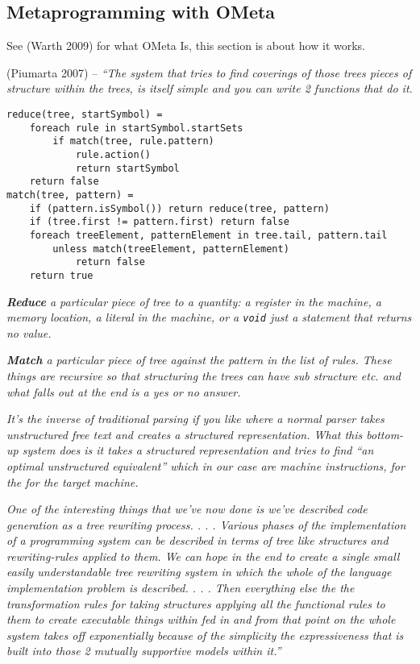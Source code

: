 \hypertarget{metaprogramming-with-ometa}{%
\subsection{\texorpdfstring{Metaprogramming with
\textbf{OMeta}}{Metaprogramming with OMeta}}\label{metaprogramming-with-ometa}}

See (Warth 2009) for what OMeta Is, this section is about how it works.

(Piumarta 2007) -- \emph{``The system that tries to find coverings of
those trees pieces of structure within the trees, is itself simple and
you can write 2 functions that do it.}

\begin{verbatim}
reduce(tree, startSymbol) =
    foreach rule in startSymbol.startSets
        if match(tree, rule.pattern)
            rule.action()
            return startSymbol
    return false
match(tree, pattern) =
    if (pattern.isSymbol()) return reduce(tree, pattern)
    if (tree.first != pattern.first) return false
    foreach treeElement, patternElement in tree.tail, pattern.tail
        unless match(treeElement, patternElement)
            return false
    return true
\end{verbatim}

\emph{\textbf{Reduce} a particular piece of tree to a quantity: a
register in the machine, a memory location, a literal in the machine, or
a \texttt{void} just a statement that returns no value.}

\emph{\textbf{Match} a particular piece of tree against the pattern in
the list of rules. These things are recursive so that structuring the
trees can have sub structure etc. and what falls out at the end is a yes
or no answer.}

\emph{It's the inverse of traditional parsing if you like where a normal
parser takes unstructured free text and creates a structured
representation. What this bottom-up system does is it takes a structured
representation and tries to find ``an optimal unstructured equivalent''
which in our case are machine instructions, for the for the target
machine.}

\emph{One of the interesting things that we've now done is we've
described code generation as a tree rewriting process. . . . Various
phases of the implementation of a programming system can be described in
terms of tree like structures and rewriting-rules applied to them. We
can hope in the end to create a single small easily understandable tree
rewriting system in which the whole of the language implementation
problem is described. . . . Then everything else the the transformation
rules for taking structures applying all the functional rules to them to
create executable things within fed in and from that point on the whole
system takes off exponentially because of the simplicity the
expressiveness that is built into those 2 mutually supportive models
within it.''}

